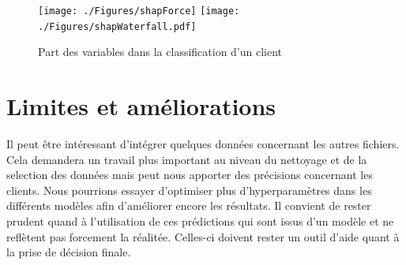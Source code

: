 \documentclass[12pt, a4paper]{article}
\begin{document}
\begin{figure}[h]
    \begin{center}
        \texttt{[image: ./Figures/shapForce]}
        \texttt{[image: ./Figures/shapWaterfall.pdf]}
    \end{center}
    \caption{Part des variables dans la classification d'un client}
    \label{fig:shapWaterfall}
\end{figure}

\section{Limites et améliorations}

Il peut être intéressant d'intégrer quelques données concernant les autres fichiers.
Cela demandera un travail plus important au niveau du nettoyage et de la selection des données mais peut nous apporter des précisions concernant les clients. 
Nous pourrions essayer d'optimiser plus d'hyperparamètres dans les différents modèles afin d'améliorer encore les résultats.
Il convient de rester prudent quand à l'utilisation de ces prédictions qui sont issus d'un modèle et ne reflètent pas forcement la réalitée. Celles-ci doivent rester un outil d'aide quant à la prise de décision finale.
\end{document}
